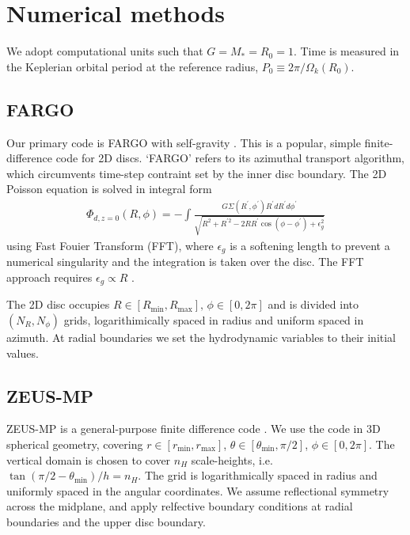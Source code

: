 \section{Numerical methods}

We adopt computational units such that $G=M_*=R_0=1$. Time is measured
in the Keplerian orbital period at the reference radius, $P_0\equiv 
2\pi/\Omega_k(R_0)$.  

\subsection{FARGO}
Our primary code is FARGO with self-gravity \citep{baruteau08}. This
is a popular, simple finite-difference code for 2D discs. `FARGO' refers
to its azimuthal transport algorithm, which circumvents time-step
contraint set by the inner disc boundary. 
The 2D Poisson equation is solved in integral form 
\begin{align}\label{2d_grav}
  \Phi_{d,z=0}(R,\phi) = - \int
  \frac{G\Sigma(R^\prime,\phi^\prime)R^\prime dR^\prime d\phi^\prime}{\sqrt{R^2+R^{\prime 2} -
      2RR^\prime\cos{(\phi - \phi^\prime)} + \epsilon_g^2}} 
\end{align}
using Fast Fouier Transform (FFT), where $\epsilon_g$ is a softening
length to prevent a numerical singularity and the integration is taken
over the disc. The FFT approach requires
$\epsilon_g\propto R$ \citep{baruteau08}.  

The 2D disc occupies
$R\in[R_\mathrm{min},R_\mathrm{max}],\,\phi\in[0,2\pi]$ and is
divided into $(N_R,N_\phi)$ grids, logarithimically spaced in radius and
uniform spaced in azimuth. At radial boundaries we set the
hydrodynamic variables to their initial values.         

\subsection{ZEUS-MP}
ZEUS-MP  is a general-purpose finite difference
code \citep{hayes06}. We use the code in 3D spherical geometry, covering
$r\in[r_\mathrm{min},r_\mathrm{max}]$, $\theta\in[\theta_\mathrm{min},\pi/2]$,
$\phi\in[0,2\pi]$. The vertical domain is chosen to cover $n_H$
scale-heights, i.e. $\tan{(\pi/2 - \theta_\mathrm{min})}/h=n_H$. 
The grid is logarithmically spaced in radius and uniformly spaced in the angular
coordinates. We assume reflectional symmetry across the midplane, and
apply relfective boundary conditions at radial boundaries and the
upper disc boundary.  


